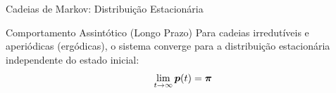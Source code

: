 \begin{frame}{Cadeias de Markov: Distribuição Estacionária}

\vspace{0.2cm}

\begin{exampleblock}{Comportamento Assintótico (Longo Prazo)}
Para cadeias irredutíveis e aperiódicas (ergódicas), o sistema converge para a distribuição estacionária independente do estado inicial:
\begin{equation*}
\lim_{t \to \infty} \boldsymbol{p}(t) = \boldsymbol{\pi}
\end{equation*}
\end{exampleblock}
\end{frame}

